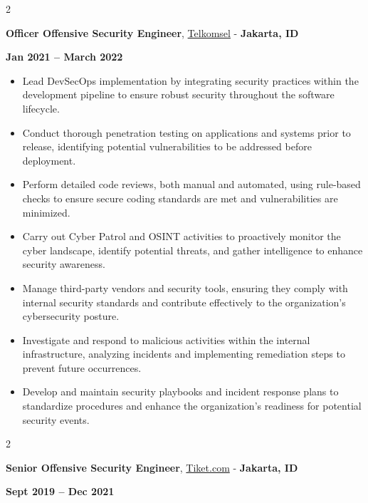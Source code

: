 \documentclass[10pt, letterpaper]{article}
\newenvironment{highlights}{
    \begin{itemize}[
        topsep=0.10 cm,
        parsep=0.10 cm,
        partopsep=0pt,
        itemsep=0pt,
        leftmargin=0 cm + 10pt
    ]
}{
    \end{itemize}
} %
\newenvironment{twocolentry}[2][]{
    \onecolentry
    \def\secondColumn{#2}
    \setcolumnwidth{\fill, 4.5 cm}
    \begin{paracol}{2}
}{
    \switchcolumn \raggedleft \secondColumn
    \end{paracol}
    \endonecolentry
} %
\let\hrefWithoutArrow\href
\begin{document}
		
		\begin{twocolentry}{\textbf{Jan 2021 – March 2022}}
			\textbf{Officer Offensive Security Engineer}, \hrefWithoutArrow{https://www.telkomsel.com/}{Telkomsel} - \textbf{Jakarta, ID}
		\end{twocolentry}
		
		\vspace{0.10 cm}
		\begin{justify}
			
			\begin{highlights}
			\item Lead DevSecOps implementation by integrating security practices within the development pipeline to ensure robust security throughout the software lifecycle.
			
			\item Conduct thorough penetration testing on applications and systems prior to release, identifying potential vulnerabilities to be addressed before deployment.
			
			\item Perform detailed code reviews, both manual and automated, using rule-based checks to ensure secure coding standards are met and vulnerabilities are minimized.
			
			\item Carry out Cyber Patrol and OSINT activities to proactively monitor the cyber landscape, identify potential threats, and gather intelligence to enhance security awareness.
			
			\item Manage third-party vendors and security tools, ensuring they comply with internal security standards and contribute effectively to the organization's cybersecurity posture.
			
			\item Investigate and respond to malicious activities within the internal infrastructure, analyzing incidents and implementing remediation steps to prevent future occurrences.
			
			\item Develop and maintain security playbooks and incident response plans to standardize procedures and enhance the organization’s readiness for potential security events.
			
			
			
			\end{highlights}
		\end{justify}

			\begin{twocolentry}{\textbf{Sept 2019 – Dec 2021}}
			\textbf{Senior Offensive Security Engineer}, \hrefWithoutArrow{https://tiket.com/}{Tiket.com} - \textbf{Jakarta, ID}
		\end{twocolentry}
		
\end{document}
